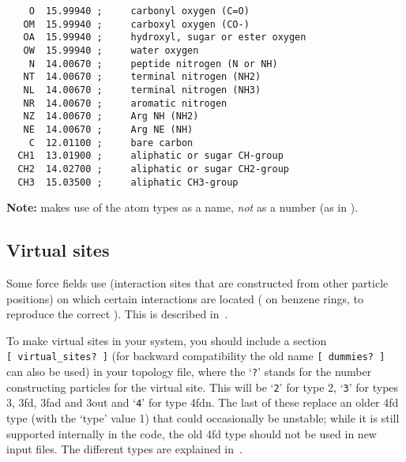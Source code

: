{\small
\begin{verbatim}
    O  15.99940 ;     carbonyl oxygen (C=O)
   OM  15.99940 ;     carboxyl oxygen (CO-)
   OA  15.99940 ;     hydroxyl, sugar or ester oxygen
   OW  15.99940 ;     water oxygen
    N  14.00670 ;     peptide nitrogen (N or NH)
   NT  14.00670 ;     terminal nitrogen (NH2)
   NL  14.00670 ;     terminal nitrogen (NH3)
   NR  14.00670 ;     aromatic nitrogen
   NZ  14.00670 ;     Arg NH (NH2)
   NE  14.00670 ;     Arg NE (NH)
    C  12.01100 ;     bare carbon
  CH1  13.01900 ;     aliphatic or sugar CH-group
  CH2  14.02700 ;     aliphatic or sugar CH2-group
  CH3  15.03500 ;     aliphatic CH3-group
\end{verbatim}}

{\bf Note:} {\gromacs} makes use of the atom types as a name, {\em
not} as a number (as {\eg} in {\gromos}).


%
%

\subsection{Virtual sites}
\label{sec:vsitetop}
Some force fields use 
(interaction sites that are constructed from other particle positions)
on which certain interactions are located
({\eg} on benzene rings, to reproduce the correct
). This is described in~.

To make virtual sites in your system, you should include a section
{\tt [~virtual_sites?~]} (for backward compatibility the old name
{\tt [~dummies?~]} can also be used) in your topology file,
where the `{\tt ?}' stands
for the number constructing particles for the virtual site. This will be
`{\tt 2}' for type 2, `{\tt 3}' for types 3, 3fd, 3fad and 3out and
`{\tt 4}' for type 4fdn. The last of these replace an older 4fd type (with the `type' value 1) 
that could occasionally be unstable; while it is still supported internally
in the code, the old 4fd type should not be used in new input files.
 The different types are explained
in~.

